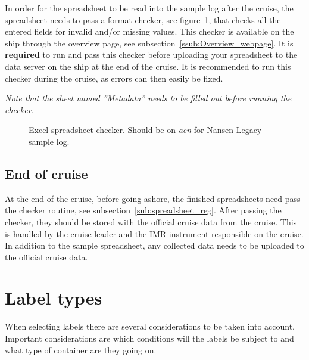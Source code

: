 \documentclass[a4paper,english, 11pt]{article}
\begin{document}
In order for the spreadsheet to be read into the sample log after the cruise, the spreadsheet needs to pass a format checker, see figure~\ref{fig:checker}, that checks all the entered fields for invalid and/or missing values. This checker is available on the ship through the overview page, see subsection~\ref{ssub:Overview_webpage}. It is \textbf{required} to run and pass this checker before uploading your spreadsheet to the data server on the ship at the end of the cruise. It is recommended to run this checker during the cruise, as errors can then easily be fixed.

\emph{Note that the sheet named ''Metadata'' needs to be filled out before running the checker.}

\begin{figure}[htb]
    \caption{\label{fig:checker}
        Excel spreadsheet checker. Should be on \emph{aen} for Nansen Legacy sample log.
    }
\end{figure}


\subsection{End of cruise} %
\label{sub:end_of_cruise}

At the end of the cruise, before going ashore, the finished spreadsheets need pass the checker routine, see subsection~\ref{sub:spreadsheet_reg}. After passing the checker, they should be stored with the official cruise data from the cruise. This is handled by the cruise leader and the IMR instrument responsible on the cruise. In addition to the sample spreadsheet, any collected data needs to be uploaded to the official cruise data.

\section{Label types} %
\label{sub:Labels}

When selecting labels there are several considerations to be taken into account. Important considerations are which conditions will the labels be subject to and what type of container are they going on.
\end{document}
